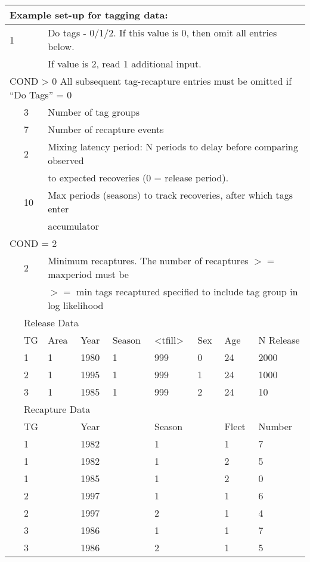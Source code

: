 \begin{center}
	\begin{longtable}{p{1.1cm} p{1.1cm} p{1.1cm} p{1.1cm} p{1.1cm} p{1.1cm} p{1.1cm} p{1.1cm} p{3cm}}
		\multicolumn{9}{l}{Example set-up for tagging data:} \\
		\hline
		1 & & \multicolumn{7}{l}{Do tags - 0/1/2. If this value is 0, then omit all entries below.} \\
		&   & \multicolumn{7}{l}{If value is 2, read 1 additional input.} \Tstrut\Bstrut\\
		\hline
		\multicolumn{9}{l}{COND > 0 All subsequent tag-recapture entries must be omitted if ``Do Tags'' = 0}
		 \Tstrut\\

		 & 3 & \multicolumn{7}{l}{Number of tag groups} \Bstrut\\
		 \hline
		 & 7 & \multicolumn{7}{l}{Number of recapture events} \Tstrut\Bstrut\\
		 \hline
		 & 2 & \multicolumn{7}{l}{Mixing latency period: N periods to delay before comparing observed} \Tstrut\\
		 &   &  \multicolumn{7}{l}{to expected recoveries (0 = release period).} \Bstrut\\
		 \hline
		 & 10 & \multicolumn{7}{l}{Max periods (seasons) to track recoveries, after which tags enter} \Tstrut\\
		 &    & \multicolumn{7}{l}{accumulator} \Bstrut\\
		 \hline
		 \multicolumn{9}{l}{COND = 2} \Tstrut\\
		 &  2 &  \multicolumn{7}{l}{Minimum recaptures. The number of recaptures $>=$ maxperiod must be} \\
		 &    &  \multicolumn{7}{l}{$>=$ min tags recaptured specified to include tag group in log likelihood}\Bstrut\\
		 
		 \hline
		 & \multicolumn{8}{l}{Release Data} \Tstrut\\ 
		 & TG & Area & Year & Season & <tfill> & Sex & Age & N Release \Bstrut\\ 
		 \hline
		 & 1 & 1 & 1980 & 1 & 999 & 0 & 24 & 2000 \Tstrut\\
		 & 2 & 1 & 1995 & 1 & 999 & 1 & 24 & 1000 \\
		 & 3 & 1 & 1985 & 1 & 999 & 2 & 24 & 10 \Bstrut\\
		 \hline
		 & \multicolumn{8}{l}{Recapture Data} \Tstrut\\
		 & TG &  & Year &  & Season &  & Fleet & Number \Bstrut\\ 
		 \pagebreak
		 & 1 & & 1982 & & 1 & & 1 & 7 \Tstrut\\
		 & 1 & & 1982 & & 1 & & 2 & 5 \\
		 & 1 & & 1985 & & 1 & & 2 & 0 \\
		 & 2 & & 1997 & & 1 & & 1 & 6 \\
		 & 2 & & 1997 & & 2 & & 1 & 4 \\
		 & 3 & & 1986 & & 1 & & 1 & 7 \\
		 & 3 & & 1986 & & 2 & & 1 & 5 \Bstrut\\
		 \hline
	\end{longtable}
\end{center}

